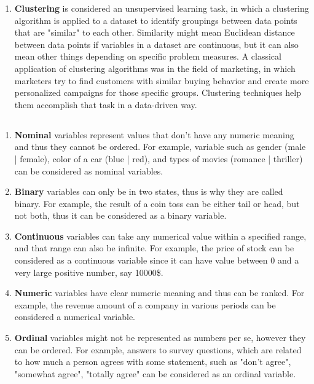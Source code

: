 \documentclass{homework2_template}
\begin{document}
\begin{enumerate}
  \item \textbf{Clustering} is considered an unsupervised learning task, in which a clustering algorithm is applied to a dataset to identify groupings between data points that are "similar" to each other. Similarity might mean Euclidean distance between data points if variables in a dataset are continuous, but it can also mean other things depending on specific problem measures. A classical application of clustering algorithms was in the field of marketing, in which marketers try to find customers with similar buying behavior and create more personalized campaigns for those specific groups. Clustering techniques help them accomplish that task in a data-driven way.

\end{enumerate}

\subsection{}
\begin{enumerate}
    \item \textbf{Nominal} variables represent values that don't have any numeric meaning and thus they cannot be ordered. For example, variable such as gender (male | female), color of a car (blue | red), and types of movies (romance | thriller) can be considered as nominal variables.
    
    \item \textbf{Binary} variables can only be in two states, thus is why they are called binary. For example, the result of a coin toss can be either tail or head, but not both, thus it can be considered as a binary variable.
    
    \item \textbf{Continuous} variables can take any numerical value within a specified range, and that range can also be infinite. For example, the price of stock can be considered as a continuous variable since it can have value between 0 and a very large positive number, say 10000\$.
    
    \item \textbf{Numeric} variables have clear numeric meaning and thus can be ranked. For example, the revenue amount of a company in various periods can be considered a numerical variable. 
    
    \item \textbf{Ordinal} variables might not be represented as numbers per se, however they can be ordered. For example, answers to survey questions, which are related to how much a person agrees with some statement, such as "don't agree", "somewhat agree", "totally agree" can be considered as an ordinal variable.
    
\end{enumerate}
\end{document}
